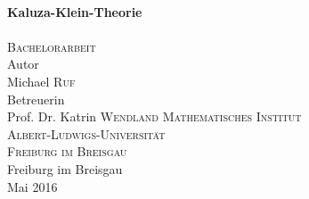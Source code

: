 \begin{titlepage}
\begin{center}
	\HRule \\[0.4cm]
	{ \huge \bfseries Kaluza-Klein-Theorie}\\
	\HRule \\[2cm]
	
	\textsc{\LARGE Bachelorarbeit}\\[1.5cm]
	
	\large Autor \\
  	\Large Michael \textsc{Ruf}\\[1.5cm]
  	
  	\large Betreuerin\\
  	\Large Prof. Dr. Katrin \textsc{Wendland}
  	\vfill
	\normalsize
	\textsc{Mathematisches Institut} \\
	\textsc{Albert-Ludwigs-Universität} \\
	\textsc{Freiburg im Breisgau} \\[2cm]
  
	\large Freiburg im Breisgau \\
	Mai 2016
\end{center}
\end{titlepage} 

